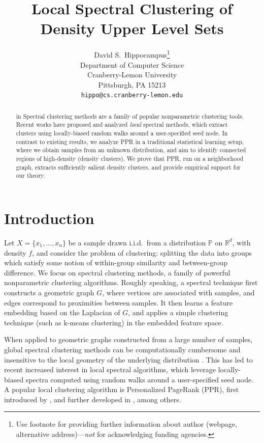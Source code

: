 \documentclass{article}
\title{Local Spectral Clustering of Density Upper Level Sets}
\author{%
  David S.~Hippocampus\thanks{Use footnote for providing further information
    about author (webpage, alternative address)---\emph{not} for acknowledging
    funding agencies.} \\
  Department of Computer Science\\
  Cranberry-Lemon University\\
  Pittsburgh, PA 15213 \\
  \texttt{hippo@cs.cranberry-lemon.edu} \\
}
\newcommand{\Reals}{\mathbb{R}}
\newcommand{\Rd}{\Reals^d}
\newcommand{\1}{\mathbf{1}}
\newcommand{\Xbf}{X}             %
\newcommand{\Pbb}{\mathbb{P}}
\newcommand{\ppr}{{\sc PPR}}
\theoremstyle{aldenthm}
\theoremstyle{aldenrmrk}
\begin{document}
\maketitle

\begin{abstract}
 in
  Spectral clustering methods are a family of popular nonparametric clustering
  tools.  Recent works have proposed and analyzed \emph{local} spectral methods,
  which extract clusters using locally-biased random walks around a user-specified
  seed node.  In contrast to existing results, we analyze PPR in a traditional
  statistical learning setup, where we obtain samples from an unknown
  distribution, and aim to identify connected regions of high-density (density
  clusters).  We prove that PPR, run on a neighborhood graph, extracts
  sufficiently salient density clusters, and provide empirical support for our theory.
\end{abstract}

\section{Introduction}
\label{sec: introduction}

Let $\Xbf = \{x_1, \ldots, x_n\}$ be a sample drawn i.i.d.\ from a
distribution $\Pbb$ on $\Rd$, with density $f$, and consider the problem of 
clustering: splitting the data into groups which satisfy some notion of
within-group similarity and between-group difference.  We focus on spectral
clustering methods, a family of powerful nonparametric clustering algorithms.
Roughly speaking, a spectral technique first constructs a geometric graph $G$,
where vertices are associated with samples, and edges correspond to proximities
between samples. It then learns a feature embedding based on the Laplacian of
$G$, and applies a simple clustering technique (such as k-means clustering) in
the embedded feature space.

When applied to geometric graphs constructed from a large number of samples,
global spectral clustering methods can be computationally cumbersome and   
insensitive to the local geometry of the underlying distribution
\citep{leskovec2010,mahoney2012}.  This has led to recent increased interest in
local spectral algorithms, which leverage locally-biased spectra computed using
random walks around a user-specified seed node.  A popular local clustering
algorithm is Personalized PageRank (\ppr), first introduced by
\citet{haveliwala2003}, and further developed in
\citep{spielman2011,spielman2014,andersen2006,mahoney2012,zhu2013},
among others.  
\end{document}
